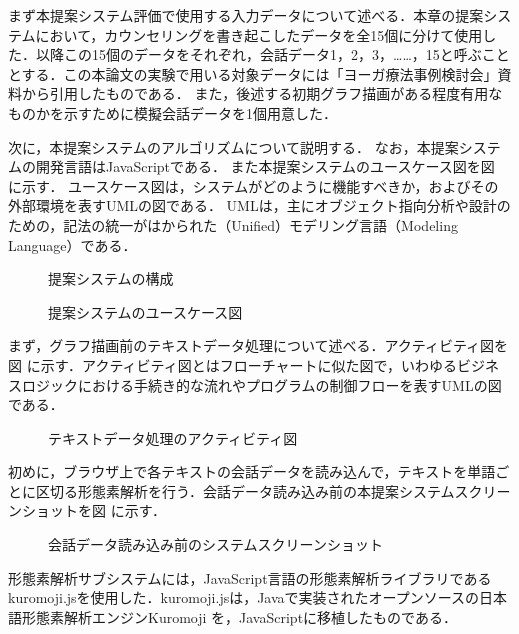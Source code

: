 \documentclass[shuuron]{kuee}
\begin{document}
まず本提案システム評価で使用する入力データについて述べる．本章の提案システムにおいて，カウンセリングを書き起こしたデータを全15個に分けて使用した．以降この15個のデータをそれぞれ，会話データ1，2，3，……，15と呼ぶこととする．この本論文の実験で用いる対象データには「ヨーガ療法事例検討会」資料から引用したものである．
また，後述する初期グラフ描画がある程度有用なものかを示すために模擬会話データを1個用意した．

次に，本提案システムのアルゴリズムについて説明する．
なお，本提案システムの開発言語はJavaScriptである．
また本提案システムのユースケース図を図
に示す．
ユースケース図は，システムがどのように機能すべきか，およびその外部環境を表すUMLの図である．
UMLは，主にオブジェクト指向分析や設計のための，記法の統一がはかられた（Unified）モデリング言語（Modeling Language）である．


\begin{figure}
   \begin{center}
   \end{center}
   \caption{提案システムの構成}
   \label{fig:4_2}
 \end{figure}

\begin{figure}
   \begin{center}
   \end{center}
   \caption{提案システムのユースケース図}
   \label{fig:use_case_diagram}
 \end{figure}


まず，グラフ描画前のテキストデータ処理について述べる．アクティビティ図を図
に示す．アクティビティ図とはフローチャートに似た図で，いわゆるビジネスロジックにおける手続き的な流れやプログラムの制御フローを表すUMLの図である．
\begin{figure}
   \begin{center}
   \end{center}
   \caption{テキストデータ処理のアクティビティ図}
   \label{fig:activity}
\end{figure}


初めに，ブラウザ上で各テキストの会話データを読み込んで，テキストを単語ごとに区切る形態素解析を行う．会話データ読み込み前の本提案システムスクリーンショットを図
に示す．
 \begin{figure}
   \begin{center}
   \end{center}
   \caption{会話データ読み込み前のシステムスクリーンショット}
   \label{fig:yomikomimae2}
 \end{figure}
形態素解析サブシステムには，JavaScript言語の形態素解析ライブラリであるkuromoji.js\cite{kuromojijs}を使用した．kuromoji.jsは，Javaで実装されたオープンソースの日本語形態素解析エンジンKuromoji
を，JavaScriptに移植したものである．
\end{document}
